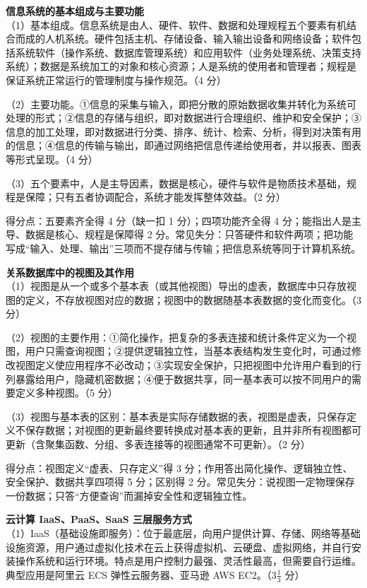 \documentclass[a4paper,11pt]{article}
\begin{document}
\newpage
{}

\q \textbf{信息系统的基本组成与主要功能}\\
（1）基本组成。信息系统是由人、硬件、软件、数据和处理规程五个要素有机结合而成的人机系统。硬件包括主机、存储设备、输入输出设备和网络设备；软件包括系统软件（操作系统、数据库管理系统）和应用软件（业务处理系统、决策支持系统）；数据是系统加工的对象和核心资源；人是系统的使用者和管理者；规程是保证系统正常运行的管理制度与操作规范。（4 分）

（2）主要功能。①信息的采集与输入，即把分散的原始数据收集并转化为系统可处理的形式；②信息的存储与组织，即对数据进行合理组织、维护和安全保护；③信息的加工处理，即对数据进行分类、排序、统计、检索、分析，得到对决策有用的信息；④信息的传输与输出，即通过网络把信息传递给使用者，并以报表、图表等形式呈现。（4 分）

（3）五个要素中，人是主导因素，数据是核心，硬件与软件是物质技术基础，规程是保障；只有五者协调配合，系统才能发挥整体效益。（2 分）
\begin{analysis}得分点：五要素齐全得 4 分（缺一扣 1 分）；四项功能齐全得 4 分；能指出人是主导、数据是核心、规程是保障得 2 分。常见失分：只答硬件和软件两项；把功能写成“输入、处理、输出”三项而不提存储与传输；把信息系统等同于计算机系统。\end{analysis}

\q \textbf{关系数据库中的视图及其作用}\\
（1）视图是从一个或多个基本表（或其他视图）导出的虚表，数据库中只存放视图的定义，不存放视图对应的数据；视图中的数据随基本表数据的变化而变化。（3 分）

（2）视图的主要作用：①简化操作，把复杂的多表连接和统计条件定义为一个视图，用户只需查询视图；②提供逻辑独立性，当基本表结构发生变化时，可通过修改视图定义使应用程序不必改动；③实现安全保护，只把视图中允许用户看到的行列暴露给用户，隐藏机密数据；④便于数据共享，同一基本表可以按不同用户的需要定义多种视图。（5 分）

（3）视图与基本表的区别：基本表是实际存储数据的表，视图是虚表，只保存定义不保存数据；对视图的更新最终要转换成对基本表的更新，且并非所有视图都可更新（含聚集函数、分组、多表连接等的视图通常不可更新）。（2 分）
\begin{analysis}得分点：视图定义“虚表、只存定义”得 3 分；作用答出简化操作、逻辑独立性、安全保护、数据共享四项得 5 分；区别得 2 分。常见失分：说视图一定物理保存一份数据；只答“方便查询”而漏掉安全性和逻辑独立性。\end{analysis}

\q \textbf{云计算 IaaS、PaaS、SaaS 三层服务方式}\\
（1）IaaS（基础设施即服务）：位于最底层，向用户提供计算、存储、网络等基础设施资源，用户通过虚拟化技术在云上获得虚拟机、云硬盘、虚拟网络，并自行安装操作系统和运行环境。特点是用户控制力最强、灵活性最高，但需要自行运维。典型应用是阿里云 ECS 弹性云服务器、亚马逊 AWS EC2。（3$\frac{1}{3}$ 分）
\end{document}
